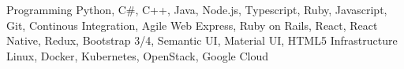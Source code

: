 \begin{cvskills}
  \cvskill
    {Programming}
    {Python, C\#, C++, Java, Node.js, Typescript, Ruby, Javascript, Git, Continous Integration, Agile}
  \cvskill
    {Web}
    {Express, Ruby on Rails, React, React Native, Redux, Bootstrap 3/4, Semantic UI, Material UI, HTML5}
  \cvskill
    {Infrastructure}
    {Linux, Docker, Kubernetes, OpenStack, Google Cloud}
\end{cvskills}
